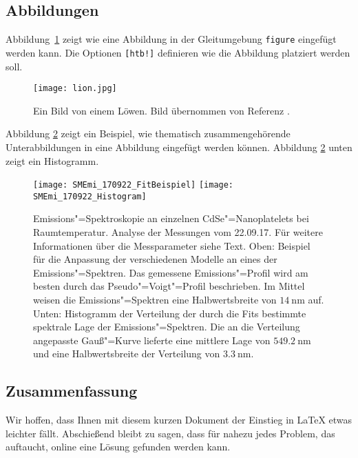 \subsection{Abbildungen}
\label{subsec:Abb}
Abbildung~\ref{fig:figureone} zeigt wie eine Abbildung in der Gleitumgebung \verb"figure" eingefügt werden kann. Die Optionen \verb"[htb!]" definieren wie die Abbildung platziert werden soll.
\begin{figure}[htb!]
 \centering
 \texttt{[image: lion.jpg]}
 \caption{\label{fig:figureone}  Ein Bild von einem Löwen. Bild übernommen von Referenz \cite{Internetbildquelle}.}
\end{figure}
%
Abbildung \ref{fig:vieleBilder} zeigt ein Beispiel, wie thematisch zusammengehörende Unterabbildungen in eine Abbildung eingefügt werden können. Abbildung \ref{fig:vieleBilder} unten zeigt ein Histogramm. 
%
\begin{figure}[h!tb]
\centering
  \texttt{[image: SMEmi\_170922\_FitBeispiel]}
\hfill
  \texttt{[image: SMEmi\_170922\_Histogram]}
\caption{Emissions"=Spektroskopie an einzelnen CdSe"=Nanoplatelets bei Raumtemperatur. Analyse der Messungen vom 22.09.17. Für weitere Informationen über die Messparameter siehe Text. Oben: Beispiel für die Anpassung der verschiedenen Modelle an eines der Emissions"=Spektren. Das gemessene Emissions"=Profil wird am besten durch das Pseudo"=Voigt"=Profil beschrieben. Im Mittel weisen die Emissions"=Spektren eine Halbwertsbreite von $\SI{14}{\nano\meter}$ auf. Unten: Histogramm der Verteilung der durch die Fits bestimmte spektrale Lage der Emissions"=Spektren. Die an die Verteilung angepasste Gauß"=Kurve lieferte eine mittlere Lage von $\SI{549,2}{\nano\meter}$ und eine Halbwertsbreite der Verteilung von $\SI{3,3}{\nano\meter}$.}
\label{fig:vieleBilder}
\end{figure}
\newline
\FloatBarrier
%
\subsection{Zusammenfassung}
\label{subsec:ZusammenLatex}
%
Wir hoffen, dass Ihnen mit diesem kurzen Dokument der Einstieg in \LaTeX{} etwas leichter fällt. Abschießend bleibt zu sagen, dass für nahezu jedes Problem, das auftaucht, online eine Lösung gefunden werden kann.